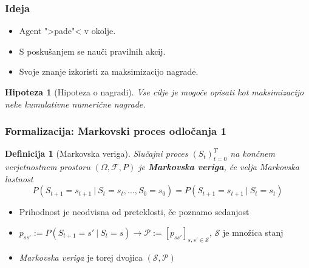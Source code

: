 \documentclass{beamer}    %
\newtheorem{definicija}[izrek]{Definicija}
\newtheorem{hipoteza}[izrek]{Hipoteza}
\begin{document}
    \begin{frame}
        \frametitle{Ideja}
        \begin{itemize}
            \item Agent ">pade"< v okolje. 
            \item S poskušanjem se nauči pravilnih akcij.
            \item Svoje znanje izkoristi za maksimizacijo nagrade.
        \end{itemize}

        \pause
        \medskip
        
        \begin{hipoteza}[Hipoteza o nagradi]
            Vse cilje je mogoče opisati kot maksimizacijo neke kumulativne numerične 
            nagrade.
        \end{hipoteza}

    \end{frame}


\begin{frame}
    \frametitle{Formalizacija: Markovski proces odločanja 1}
    \begin{definicija}[Markovska veriga]
        Slučajni proces $(S_t)_{t=0}^T$ na končnem verjetnostnem prostoru 
        $(\Omega, \mathcal{F},  P)$ je \textbf{Markovska veriga}, če velja Markovska lastnost
        $$
        P(S_{t+1} = s_{t+1}~|~S_{t} = s_{t}, ..., S_0 = s_0) = P(S_{t+1} = s_{t+1}~|~S_{t} = s_{t})
        $$
    \end{definicija}
    \pause
    \medskip
    \begin{itemize}
        \item Prihodnost je neodvisna od preteklosti, če poznamo sedanjost
        \pause
        \item $p_{ss'} := P(S_{t+1} = s'~|~S_{t} = s) \rightarrow
                \mathcal{P} := [p_{ss'}]_{s,s'\in \mathcal{S} }$, $\mathcal{S}$ 
                je množica stanj
        \item \emph{Markovska veriga} je torej dvojica $(\mathcal{S}, \mathcal{P})$
    \end{itemize}
    
\end{frame}
\end{document}
